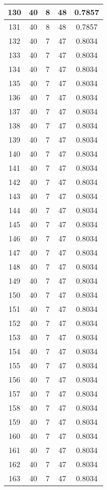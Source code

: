 \documentclass[letterpaper, 12pt]{article}
\begin{document}
\begin{longtable}{|c|c|c|c|c|}
\hline
130 & 40 & 8 & 48 & 0.7857 \\
\hline
131 & 40 & 8 & 48 & 0.7857 \\
\hline
132 & 40 & 7 & 47 & 0.8034 \\
\hline
133 & 40 & 7 & 47 & 0.8034 \\
\hline
134 & 40 & 7 & 47 & 0.8034 \\
\hline
135 & 40 & 7 & 47 & 0.8034 \\
\hline
136 & 40 & 7 & 47 & 0.8034 \\
\hline
137 & 40 & 7 & 47 & 0.8034 \\
\hline
138 & 40 & 7 & 47 & 0.8034 \\
\hline
139 & 40 & 7 & 47 & 0.8034 \\
\hline
140 & 40 & 7 & 47 & 0.8034 \\
\hline
141 & 40 & 7 & 47 & 0.8034 \\
\hline
142 & 40 & 7 & 47 & 0.8034 \\
\hline
143 & 40 & 7 & 47 & 0.8034 \\
\hline
144 & 40 & 7 & 47 & 0.8034 \\
\hline
145 & 40 & 7 & 47 & 0.8034 \\
\hline
146 & 40 & 7 & 47 & 0.8034 \\
\hline
147 & 40 & 7 & 47 & 0.8034 \\
\hline
148 & 40 & 7 & 47 & 0.8034 \\
\hline
149 & 40 & 7 & 47 & 0.8034 \\
\hline
150 & 40 & 7 & 47 & 0.8034 \\
\hline
151 & 40 & 7 & 47 & 0.8034 \\
\hline
152 & 40 & 7 & 47 & 0.8034 \\
\hline
153 & 40 & 7 & 47 & 0.8034 \\
\hline
154 & 40 & 7 & 47 & 0.8034 \\
\hline
155 & 40 & 7 & 47 & 0.8034 \\
\hline
156 & 40 & 7 & 47 & 0.8034 \\
\hline
157 & 40 & 7 & 47 & 0.8034 \\
\hline
158 & 40 & 7 & 47 & 0.8034 \\
\hline
159 & 40 & 7 & 47 & 0.8034 \\
\hline
160 & 40 & 7 & 47 & 0.8034 \\
\hline
161 & 40 & 7 & 47 & 0.8034 \\
\hline
162 & 40 & 7 & 47 & 0.8034 \\
\hline
163 & 40 & 7 & 47 & 0.8034 \\

\end{longtable}
\end{document}
